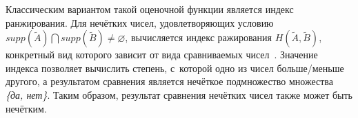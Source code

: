 Классическим вариантом такой оценочной функции является индекс ранжирования. Для нечётких чисел, удовлетворяющих условию $supp \left( \tilde A \right) \bigcap supp \left( \tilde B \right) \neq \varnothing$, вычисляется индекс ражирования $H\left(\tilde A, \tilde B \right)$, конкретный вид которого зависит от вида сравниваемых чисел~\cite{Borisov_Alexeev_Msk}. Значение индекса позволяет вычислить степень, с~которой одно из чисел больше/меньше другого, а результатом сравнения является нечёткое подмножество множества \textit{ \{да, нет\}}. Таким образом, результат сравнения нечётких чисел также может быть нечётким.